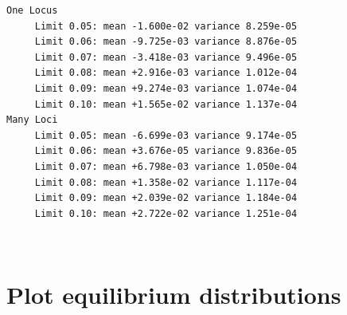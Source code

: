 \documentclass[11pt]{article}
\begin{document}
    \begin{Verbatim}[commandchars=\\\{\}]
One Locus
     Limit 0.05: mean -1.600e-02 variance 8.259e-05
     Limit 0.06: mean -9.725e-03 variance 8.876e-05
     Limit 0.07: mean -3.418e-03 variance 9.496e-05
     Limit 0.08: mean +2.916e-03 variance 1.012e-04
     Limit 0.09: mean +9.274e-03 variance 1.074e-04
     Limit 0.10: mean +1.565e-02 variance 1.137e-04
Many Loci
     Limit 0.05: mean -6.699e-03 variance 9.174e-05
     Limit 0.06: mean +3.676e-05 variance 9.836e-05
     Limit 0.07: mean +6.798e-03 variance 1.050e-04
     Limit 0.08: mean +1.358e-02 variance 1.117e-04
     Limit 0.09: mean +2.039e-02 variance 1.184e-04
     Limit 0.10: mean +2.722e-02 variance 1.251e-04

    \end{Verbatim}

    \begin{center}
    \end{center}
    { \hspace*{\fill} \\}
    
    \section{Plot equilibrium
distributions}\label{plot-equilibrium-distributions}
\end{document}

